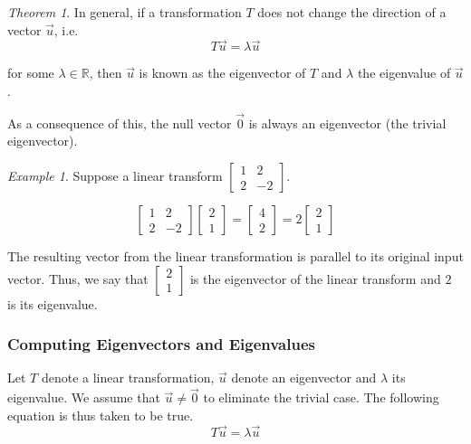 \documentclass[a4paper]{article}
\theoremstyle{remark}
\newtheorem{example}{Example}
\theoremstyle{theorem}
\newtheorem{theorem}{Theorem}
\begin{document}
\begin{theorem}
	In general, if a transformation $T$ does not change the direction of a vector $\vec{u}$, i.e. 
	\begin{equation}
		T\vec{u} = \lambda\vec{u}
	\end{equation}

	for some $\lambda\in\mathbb{R}$, then $\vec{u}$ is known as the eigenvector of $T$ and $\lambda$ the eigenvalue of $\vec{u}$.

	As a consequence of this, the null vector $\vec{0}$ is always an eigenvector (the trivial eigenvector).
\end{theorem}

\begin{example}
	Suppose a linear transform $\begin{bmatrix} 1 & 2 \\ 2 & -2\end{bmatrix}$.

	\begin{equation}
		\begin{bmatrix} 1 & 2 \\ 2 & -2\end{bmatrix}
		\begin{bmatrix} 2 \\ 1\end{bmatrix}
		=	
		\begin{bmatrix} 4 \\ 2\end{bmatrix}
		=
		2\begin{bmatrix} 2 \\ 1\end{bmatrix}
	\end{equation}

	The resulting vector from the linear transformation is parallel to its original input vector.
	Thus, we say that $\begin{bmatrix} 2 \\ 1\end{bmatrix}$ is the eigenvector of the linear transform and $2$ is its eigenvalue.
\end{example}

\subsubsection{Computing Eigenvectors and Eigenvalues}
Let $T$ denote a linear transformation, $\vec{u}$ denote an eigenvector and $\lambda$ its eigenvalue.
We assume that $\vec{u} \neq \vec{0}$ to eliminate the trivial case.
The following equation is thus taken to be true.
\begin{equation}
	T\vec{u} = \lambda\vec{u}
\end{equation}
\end{document}
